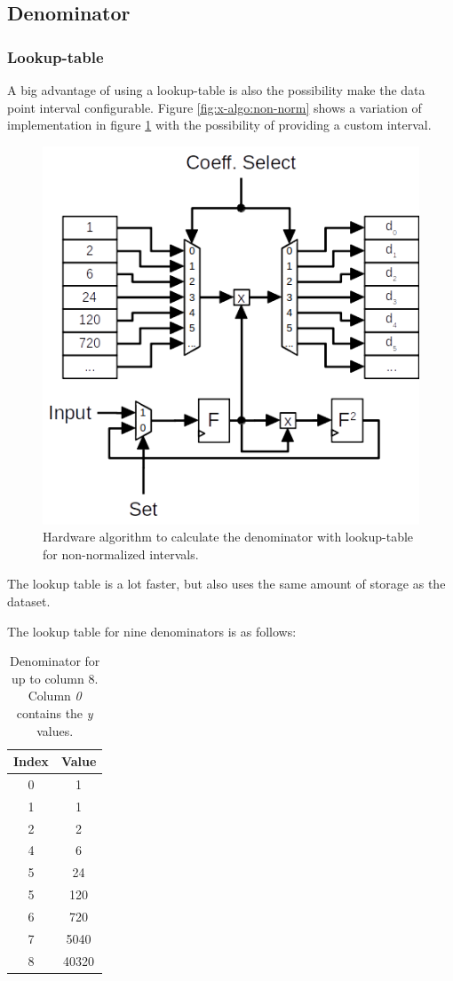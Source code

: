 \subsection{Denominator}

\subsubsection{Lookup-table}
A big advantage of using a lookup-table is also the possibility make the data
point interval configurable. Figure \ref{fig:x-algo:non-norm} shows a
variation of implementation in figure \ref{fig:x-algo:lookup} with the
possibility of providing a custom interval.

\begin{figure}[H]
	\centering
	\includegraphics[width=.8\textwidth]{content/results/x-algo_lookup.png}
	\caption{Hardware algorithm to calculate the denominator with lookup-table for non-normalized intervals.}
	\label{fig:x-algo:lookup}
\end{figure}

The lookup table is a lot faster, but also uses the same amount of storage as
the dataset.

The lookup table for nine denominators is as follows:
\begin{table}[H]
	\centering
	\begin{tabular}{ c | c }
		\textbf{Index} & \textbf{Value} \\ \hline
		{\color{gray}0} & {\color{gray}1} \\
		1 & 1 \\
		2 & 2 \\
		4 & 6 \\
		5 & 24 \\
		5 & 120 \\
		6 & 720 \\
		7 & 5040 \\
		8 & 40320 \\
	\end{tabular}
	\caption{Denominator for up to column 8. Column \textit{0} contains the \textit{y} values.}
\end{table}


